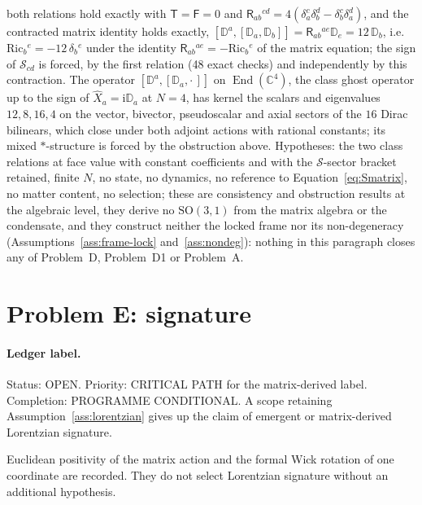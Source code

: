 both relations hold exactly with \(\mathsf T=\mathsf F=0\) and \(\mathsf R_{ab}{}^{cd}=4(\delta_a^c\delta_b^d-\delta_b^c\delta_a^d)\), and the contracted matrix identity holds exactly, \([\mathbb D^a,[\mathbb D_a,\mathbb D_b]]=\mathsf R_{ab}{}^{ae}\mathbb D_e=12\,\mathbb D_b\), i.e. \(\mathrm{Ric}_b{}^e=-12\,\delta_b{}^e\) under the identity \(\mathsf R_{ab}{}^{ae}=-\mathrm{Ric}_b{}^e\) of the matrix equation; the sign of \(\mathcal S_{cd}\) is forced, by the first relation (48 exact checks) and independently by this contraction. The operator \([\mathbb D^a,[\mathbb D_a,\cdot\,]]\) on \(\operatorname{End}(\mathbb C^4)\), the class ghost operator up to the sign of \(\hat X_a=\mathrm i\mathbb D_a\) at \(N=4\), has kernel the scalars and eigenvalues \(12,8,16,4\) on the vector, bivector, pseudoscalar and axial sectors of the \(16\) Dirac bilinears, which close under both adjoint actions with rational constants; its mixed \(*\)-structure is forced by the obstruction above. Hypotheses: the two class relations at face value with constant coefficients and with the \(\mathcal S\)-sector bracket retained, finite \(N\), no state, no dynamics, no reference to Equation~\eqref{eq:Smatrix}, no matter content, no selection; these are consistency and obstruction results at the algebraic level, they derive no \(\mathrm{SO}(3,1)\) from the matrix algebra or the condensate, and they construct neither the locked frame nor its non-degeneracy (Assumptions~\ref{ass:frame-lock} and~\ref{ass:nondeg}): nothing in this paragraph closes any of Problem~D, Problem~D1 or Problem~A.

\section{Problem E: signature}
\label{sec:status-E}

\paragraph{Ledger label.}
Status: OPEN. Priority: CRITICAL PATH for the matrix-derived label.
Completion: PROGRAMME CONDITIONAL. A scope retaining
Assumption~\ref{ass:lorentzian} gives up the claim of emergent or
matrix-derived Lorentzian signature.

Euclidean positivity of the matrix action and the formal Wick rotation of
one coordinate are recorded. They do not select Lorentzian signature without
an additional hypothesis.

